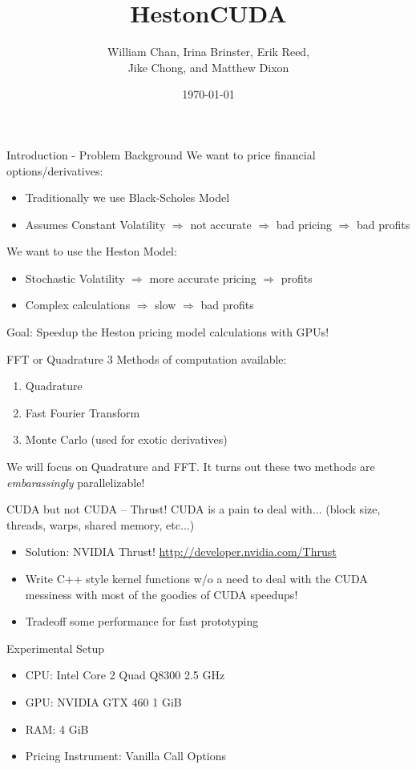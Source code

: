 \documentclass{beamer}
\title[Carnegie Mellon University]{HestonCUDA}
\author{William Chan, Irina Brinster, Erik Reed,\\Jike Chong, and Matthew Dixon}
\institute[\insertframenumber]{
  Carnegie Mellon University\\
  NASA AMES Research Park\\
  Moffett Field, California 94305\\
  \texttt{williamchan@cmu.edu}
}
\date{\today}
\begin{document}
\begin{frame}[plain]
  \titlepage
\end{frame}

\begin{frame}[t]{Introduction - Problem Background}
We want to price financial options/derivatives:
\begin{itemize}
\item Traditionally we use Black-Scholes Model
\item Assumes Constant Volatility $\Rightarrow$ not accurate $\Rightarrow$ bad pricing $\Rightarrow$ bad profits
\end{itemize}
We want to use the Heston Model:
\begin{itemize}
\item Stochastic Volatility $\Rightarrow$ more accurate pricing $\Rightarrow$ profits
\item Complex calculations $\Rightarrow$ slow $\Rightarrow$ bad profits
\end{itemize}
\vfill
Goal: Speedup the Heston pricing model calculations with GPUs!
\end{frame}

\begin{frame}[t]{FFT or Quadrature}
3 Methods of computation available:
\begin{enumerate}
\item Quadrature
\item Fast Fourier Transform
\item Monte Carlo (used for exotic derivatives)
\end{enumerate}
\vfill
We will focus on Quadrature and FFT.
It turns out these two methods are \textit{embarassingly} parallelizable!
\end{frame}

\begin{frame}[t]{CUDA but not CUDA -- Thrust!}
CUDA is a pain to deal with... (block size, threads, warps, shared memory, etc...)
\begin{itemize}
\item Solution: NVIDIA Thrust! \url{http://developer.nvidia.com/Thrust}
\item Write C++ style kernel functions w/o a need to deal with the CUDA messiness with most of the goodies of CUDA speedups!
\item Tradeoff some performance for fast prototyping
\end{itemize}
\end{frame}

\begin{frame}[t]{Experimental Setup}
\begin{itemize}
\item CPU: Intel Core 2 Quad Q8300 2.5 GHz
\item GPU: NVIDIA GTX 460 1 GiB
\item RAM: 4 GiB
\item Pricing Instrument: Vanilla Call Options
\end{itemize}
\end{frame}
\end{document}
